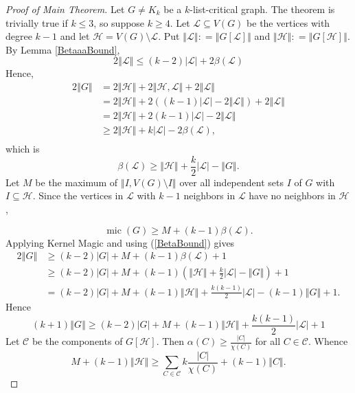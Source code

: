 \documentclass[12pt]{article}
\theoremstyle{plain}
\theoremstyle{definition}
\theoremstyle{remark}
\newcommand{\fancy}[1]{\mathcal{#1}}
\newcommand{\C}[1]{\fancy{C}_{#1}}
\renewcommand{\L}{\fancy{L}}
\newcommand{\HH}{\fancy{H}}
\newcommand{\card}[1]{\left|#1\right|}
\newcommand{\size}[1]{\left\Vert#1\right\Vert}
\newcommand{\parens}[1]{\left( #1 \right)}
\newcommand{\DefinedAs}{\mathrel{\mathop:}=}
\newcommand{\mic}{\operatorname{mic}}
\def\C{\fancy{C}}
\begin{document}
\begin{proof}[Proof of Main Theorem]
Let $G \ne K_k$ be a $k$-list-critical graph.  The theorem is trivially true if $k \le 3$, so suppose $k \ge 4$. Let $\L \subseteq V(G)$ be the vertices with degree $k-1$ and let $\HH = V(G) \setminus \L$.  Put $\size{\L} \DefinedAs \size{G[\L]}$ and $\size{\HH} \DefinedAs \size{G[\HH]}$.  
By Lemma \ref{BetaaaBound},
	\begin{equation*}
	2\size{\L} \le (k-2)|\L| + 2\beta(\L)
	\end{equation*}
	Hence,
	\begin{align*}
	2\size{G} &= 2\size{\HH} + 2\size{\HH, \L} + 2\size{\L}\\
	&= 2\size{\HH} + 2((k-1)\card{\L} - 2\size{\L}) + 2\size{\L}\\
	&= 2\size{\HH} + 2(k-1)\card{\L} - 2\size{\L}\\
	&\ge 2\size{\HH} + k\card{\L} - 2\beta(\L),\\
	\end{align*}
	which is
	\begin{equation}
	\beta(\L) \ge \size{\HH} + \frac{k}{2}\card{\L} - \size{G}.
	\label{BetaBound}
	\end{equation}
	Let $M$ be the maximum of $\size{I, V(G) \setminus I}$ over all independent sets $I$ of $G$ with $I \subseteq \HH$.   Since the vertices in $\L$ with $k-1$ neighbors in $\L$ have no neighbors in $\HH$,
	
	\begin{equation*}
		\mic(G) \ge M + (k-1)\beta(\L).
	\end{equation*}
	Applying Kernel Magic and using (\ref{BetaBound}) gives
	\begin{align*}
	2\size{G} &\ge (k-2)\card{G} + M + (k-1)\beta(\L) + 1\\
	&\ge (k-2)\card{G} + M + (k-1)\parens{\size{\HH} + \frac{k}{2}\card{\L} - \size{G}} + 1\\
	&= (k-2)\card{G} + M + (k-1)\size{\HH} + \frac{k(k-1)}{2}\card{\L} - (k-1)\size{G} + 1.
	\end{align*}		
	Hence
	\begin{equation}
	(k+1)\size{G} \ge (k-2)\card{G} + M + (k-1)\size{\HH} + \frac{k(k-1)}{2}\card{\L} + 1
	\label{KPOBound}
	\end{equation}
	Let $\C$ be the components of $G[\HH]$.  Then $\alpha(C) \ge \frac{\card{C}}{\chi(C)}$ for all $C \in \C$.  Whence
	\begin{equation}
	  M + (k-1)\size{\HH} \ge \sum_{C \in \C} k\frac{\card{C}}{\chi(C)} + (k-1)\size{C}.
	  \label{Mbound}
	\end{equation}
	

\end{proof}
\end{document}
